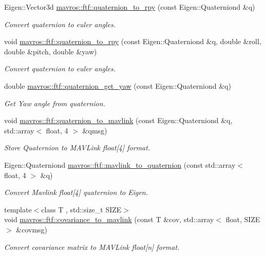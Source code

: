 \begin{DoxyCompactItemize}
Eigen\+::\+Vector3d \mbox{\hyperlink{group__nodelib_ga75c2e15dab0c54198e7f1e620744fb80}{mavros\+::ftf\+::quaternion\+\_\+to\+\_\+rpy}} (const Eigen\+::\+Quaterniond \&q)
\begin{DoxyCompactList}\small\item\em Convert quaternion to euler angles. \end{DoxyCompactList}\item 
void \mbox{\hyperlink{group__nodelib_gad1544765df8671798047de7800adb1b3}{mavros\+::ftf\+::quaternion\+\_\+to\+\_\+rpy}} (const Eigen\+::\+Quaterniond \&q, double \&roll, double \&pitch, double \&yaw)
\begin{DoxyCompactList}\small\item\em Convert quaternion to euler angles. \end{DoxyCompactList}\item 
double \mbox{\hyperlink{group__nodelib_ga6649411f7b10eb37f33afb1d3d67dfea}{mavros\+::ftf\+::quaternion\+\_\+get\+\_\+yaw}} (const Eigen\+::\+Quaterniond \&q)
\begin{DoxyCompactList}\small\item\em Get Yaw angle from quaternion. \end{DoxyCompactList}\item 
void \mbox{\hyperlink{group__nodelib_gac76089b997c4e184d99bec74603a35ad}{mavros\+::ftf\+::quaternion\+\_\+to\+\_\+mavlink}} (const Eigen\+::\+Quaterniond \&q, std\+::array$<$ float, 4 $>$ \&qmsg)
\begin{DoxyCompactList}\small\item\em Store Quaternion to M\+A\+V\+Link float\mbox{[}4\mbox{]} format. \end{DoxyCompactList}\item 
Eigen\+::\+Quaterniond \mbox{\hyperlink{group__nodelib_ga0f57da8dc483d45ac139607498cb5de4}{mavros\+::ftf\+::mavlink\+\_\+to\+\_\+quaternion}} (const std\+::array$<$ float, 4 $>$ \&q)
\begin{DoxyCompactList}\small\item\em Convert Mavlink float\mbox{[}4\mbox{]} quaternion to Eigen. \end{DoxyCompactList}\item 
{\footnotesize template$<$class T , std\+::size\+\_\+t S\+I\+ZE$>$ }\\void \mbox{\hyperlink{group__nodelib_ga8fc39ebb720c494bf3aad9d0ccdc8c60}{mavros\+::ftf\+::covariance\+\_\+to\+\_\+mavlink}} (const T \&cov, std\+::array$<$ float, S\+I\+ZE $>$ \&covmsg)
\begin{DoxyCompactList}\small\item\em Convert covariance matrix to M\+A\+V\+Link float\mbox{[}n\mbox{]} format. \end{DoxyCompactList}\item 

\end{DoxyCompactItemize}
